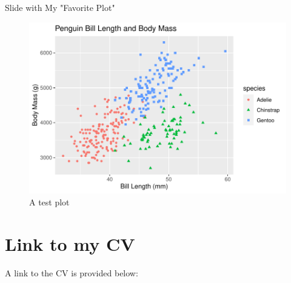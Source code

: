 \documentclass{beamer}\usepackage[]{graphicx}\usepackage[]{graphicx}\usepackage[]{xcolor}
\makeatletter
\def\maxwidth{ %
  \ifdim\Gin@nat@width>\linewidth
    \linewidth
  \else
    \Gin@nat@width
  \fi
}
\newenvironment{kframe}{%
 \def\at@end@of@kframe{}%
 \ifinner\ifhmode%
  \def\at@end@of@kframe{\end{minipage}}%
  \begin{minipage}{\columnwidth}%
 \fi\fi%
 \def\FrameCommand##1{\hskip\@totalleftmargin \hskip-\fboxsep
 \colorbox{shadecolor}{##1}\hskip-\fboxsep
     \hskip-\linewidth \hskip-\@totalleftmargin \hskip\columnwidth}%
 \MakeFramed {\advance\hsize-\width
   \@totalleftmargin\z@ \linewidth\hsize
   \@setminipage}}%
 {\par\unskip\endMakeFramed%
 \at@end@of@kframe}
\newenvironment{knitrout}{}{} %
\makeatother
\begin{document}
\begin{frame}{Slide with My "Favorite Plot"}
\begin{knitrout}
\color{fgcolor}\begin{kframe}


{\ttfamily\noindent\color{warningcolor}{\#\# Warning: Removed 2 rows containing missing values (`geom\_point()`).}}\end{kframe}\begin{figure}
\includegraphics[width=\maxwidth]{figure/figure1-1} \caption[A test plot]{A test plot}\label{fig:figure1}
\end{figure}

\end{knitrout}
\end{frame}


\section{Link to my CV}

\begin{frame}{A link to the CV is provided below:}

\href{https://www.overleaf.com/project/636d4fd7bcff6d8a03449fde}{}


\end{frame}
\end{document}
